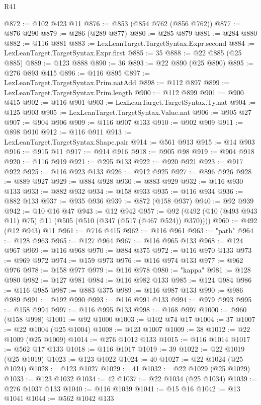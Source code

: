 \begin{lexlean}{R41}
\begin{coremodule}
@872 := @102 @423 @11
@876 := @853 (@854 @762 (@856 @762))
@877 := @876 @290
@879 := @286 (@289 @877)
@880 := @285 @879
@881 := @284 @880
@882 := @116 @881
@883 := LexLeanTarget.TargetSyntax.Expr.second
@884 := LexLeanTarget.TargetSyntax.Expr.first
@885 := 35
@888 := @22 @885 (@25 @885)
@889 := @123 @888
@890 := 36
@893 := @22 @890 (@25 @890)
@895 := @276 @893 @415
@896 := @116 @895
@897 := LexLeanTarget.TargetSyntax.Prim.natAdd
@898 := @112 @897
@899 := LexLeanTarget.TargetSyntax.Prim.length
@900 := @112 @899
@901 := @900 @415
@902 := @116 @901
@903 := LexLeanTarget.TargetSyntax.Ty.nat
@904 := @125 @903
@905 := LexLeanTarget.TargetSyntax.Value.nat
@906 := @905 @27
@907 := @904 @906
@909 := @116 @907 @133
@910 := @902 @909
@911 := @898 @910
@912 := @116 @911
@913 := LexLeanTarget.TargetSyntax.Shape.pair
@914 := @561 @913
@915 := @14 @903
@916 := @915 @11
@917 := @914 @916
@918 := @905 @98
@919 := @904 @918
@920 := @116 @919
@921 := @295 @133
@922 := @920 @921
@923 := @917 @922
@925 := @116 @923 @133
@926 := @912 @925
@927 := @896 @926
@928 := @889 @927
@929 := @884 @928
@930 := @883 @929
@932 := @116 @930 @133
@933 := @882 @932
@934 := @158 @933
@935 := @116 @934
@936 := @882 @133
@937 := @935 @936
@939 := @872 (@158 @937)
@940 := @92 @939
@942 := @10 @16 @47
@943 := @12 @942
@957 := @92 (@492 (@10 (@493 @943 @11) @75) @11 (@505 (@510 (@347 (@517 (@467 @524)) @370))))
@960 := @492 (@12 @943) @11
@961 := @716 @415
@962 := @116 @961
@963 := "path"
@964 := @128 @963
@965 := @127 @964
@967 := @116 @965 @133
@968 := @124 @967
@969 := @116 @968
@970 := @884 @375
@972 := @116 @970 @133
@973 := @969 @972
@974 := @159 @973
@976 := @116 @974 @133
@977 := @962 @976
@978 := @158 @977
@979 := @116 @978
@980 := "kappa"
@981 := @128 @980
@982 := @127 @981
@984 := @116 @982 @133
@985 := @124 @984
@986 := @116 @985
@987 := @883 @375
@989 := @116 @987 @133
@990 := @986 @989
@991 := @192 @990
@993 := @116 @991 @133
@994 := @979 @993
@995 := @158 @994
@997 := @116 @995 @133
@998 := @168 @997
@1000 := @960 (@158 @998)
@1001 := @92 @1000
@1003 := @102 @74 @17
@1004 := 37
@1007 := @22 @1004 (@25 @1004)
@1008 := @123 @1007
@1009 := 38
@1012 := @22 @1009 (@25 @1009)
@1014 := @276 @1012 @133
@1015 := @116 @1014
@1017 := @562 @17 @133
@1018 := @116 @1017
@1019 := 39
@1022 := @22 @1019 (@25 @1019)
@1023 := @123 @1022
@1024 := 40
@1027 := @22 @1024 (@25 @1024)
@1028 := @123 @1027
@1029 := 41
@1032 := @22 @1029 (@25 @1029)
@1033 := @123 @1032
@1034 := 42
@1037 := @22 @1034 (@25 @1034)
@1039 := @276 @1037 @133
@1040 := @116 @1039
@1041 := @15 @16
@1042 := @13 @1041
@1044 := @562 @1042 @133

\end{coremodule}
\end{lexlean}

